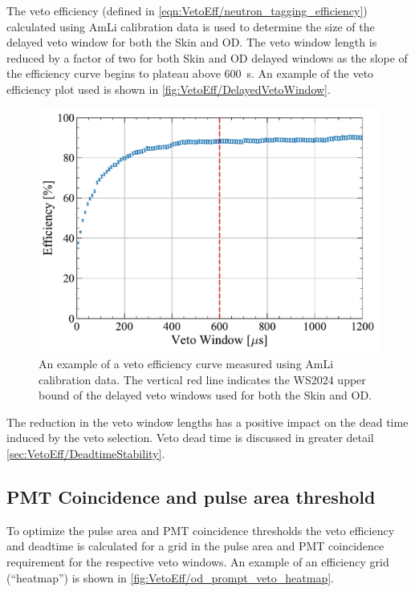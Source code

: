 The veto efficiency (defined in \ref{eqn:VetoEff/neutron_tagging_efficiency}) calculated using AmLi calibration data is used to determine the size of the delayed veto window for both the Skin and OD. The veto window length is reduced by a factor of two for both Skin and OD delayed windows as the slope of the efficiency curve begins to plateau above 600~\textmu s. An example of the veto efficiency plot used is shown in \autoref{fig:VetoEff/DelayedVetoWindow}.
\begin{figure}[!ht]
    \centering
    \includegraphics[width=0.7\linewidth]{figures/VetoEfficiency/DelayedVetoWindow.pdf}
    \caption{An example of a veto efficiency curve measured using AmLi calibration data. The vertical red line indicates the WS2024 upper bound of the delayed veto windows used for both the Skin and OD.}
    \label{fig:VetoEff/DelayedVetoWindow}
\end{figure}

The reduction in the veto window lengths has a positive impact on the dead time induced by the veto selection. Veto dead time is discussed in greater detail \autoref{sec:VetoEff/DeadtimeStability}.

\subsection{PMT Coincidence and pulse area threshold}
To optimize the pulse area and PMT coincidence thresholds the veto efficiency and deadtime is calculated for a grid in the pulse area and PMT coincidence requirement for the respective veto windows. An example of an efficiency grid (``heatmap'') is shown in \autoref{fig:VetoEff/od_prompt_veto_heatmap}. %

